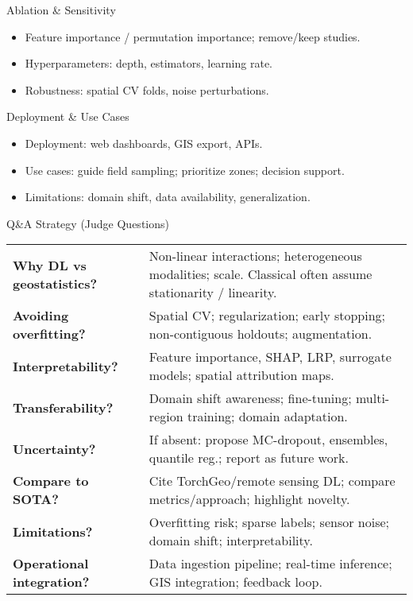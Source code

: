 \documentclass[aspectratio=169]{beamer}
\begin{document}
\begin{frame}{Ablation \& Sensitivity}
  \begin{itemize}
    \item Feature importance / permutation importance; remove/keep studies.
    \item Hyperparameters: depth, estimators, learning rate.
    \item Robustness: spatial CV folds, noise perturbations.
  \end{itemize}
\end{frame}

\begin{frame}{Deployment \& Use Cases}
  \begin{itemize}
    \item Deployment: web dashboards, GIS export, APIs.
    \item Use cases: guide field sampling; prioritize zones; decision support.
    \item Limitations: domain shift, data availability, generalization.
  \end{itemize}
\end{frame}

\begin{frame}{Q\&A Strategy (Judge Questions)}
  \small
  \begin{tabular}{p{} p{}}
  \textbf{Why DL vs geostatistics?} & Non-linear interactions; heterogeneous modalities; scale. Classical often assume stationarity / linearity. \\
  \textbf{Avoiding overfitting?} & Spatial CV; regularization; early stopping; non-contiguous holdouts; augmentation. \\
  \textbf{Interpretability?} & Feature importance, SHAP, LRP, surrogate models; spatial attribution maps. \\
  \textbf{Transferability?} & Domain shift awareness; fine-tuning; multi-region training; domain adaptation. \\
  \textbf{Uncertainty?} & If absent: propose MC-dropout, ensembles, quantile reg.; report as future work. \\
  \textbf{Compare to SOTA?} & Cite TorchGeo/remote sensing DL; compare metrics/approach; highlight novelty. \\
  \textbf{Limitations?} & Overfitting risk; sparse labels; sensor noise; domain shift; interpretability. \\
  \textbf{Operational integration?} & Data ingestion pipeline; real-time inference; GIS integration; feedback loop. \\
  \end{tabular}
\end{frame}
\end{document}

